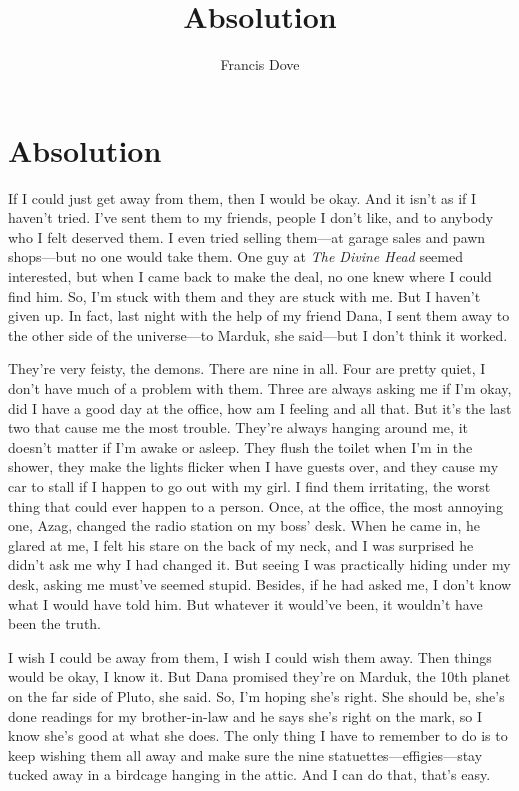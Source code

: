 \documentclass[
]{article}
\title{Absolution}
\author{Francis Dove}
\date{}
\begin{document}
\maketitle

\section{Absolution}\label{absolution}

If I could just get away from them, then I would be okay. And it isn't
as if I haven't tried. I've sent them to my friends, people I don't
like, and to anybody who I felt deserved them. I even tried selling
them---at garage sales and pawn shops---but no one would take them. One
guy at \emph{The Divine Head} seemed interested, but when I came back to
make the deal, no one knew where I could find him. So, I'm stuck with
them and they are stuck with me. But I haven't given up. In fact, last
night with the help of my friend Dana, I sent them away to the other
side of the universe---to Marduk, she said---but I don't think it
worked.

They're very feisty, the demons. There are nine in all. Four are pretty
quiet, I don't have much of a problem with them. Three are always asking
me if I'm okay, did I have a good day at the office, how am I feeling
and all that. But it's the last two that cause me the most trouble.
They're always hanging around me, it doesn't matter if I'm awake or
asleep. They flush the toilet when I'm in the shower, they make the
lights flicker when I have guests over, and they cause my car to stall
if I happen to go out with my girl. I find them irritating, the worst
thing that could ever happen to a person. Once, at the office, the most
annoying one, Azag, changed the radio station on my boss' desk. When he
came in, he glared at me, I felt his stare on the back of my neck, and I
was surprised he didn't ask me why I had changed it. But seeing I was
practically hiding under my desk, asking me must've seemed stupid.
Besides, if he had asked me, I don't know what I would have told him.
But whatever it would've been, it wouldn't have been the truth.

I wish I could be away from them, I wish I could wish them away. Then
things would be okay, I know it. But Dana promised they're on Marduk,
the 10th planet on the far side of Pluto, she said. So, I'm hoping she's
right. She should be, she's done readings for my brother-in-law and he
says she's right on the mark, so I know she's good at what she does. The
only thing I have to remember to do is to keep wishing them all away and
make sure the nine statuettes---effigies---stay tucked away in a
birdcage hanging in the attic. And I can do that, that's easy.
\end{document}
